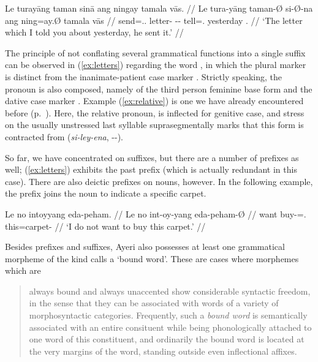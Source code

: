 \a\label{ex:relative}\begingl
	\gla Le turayāng taman sinā ang ningay tamala vās. //
	\glb Le tura-yāng taman-Ø si-Ø-na ang ning=ay.Ø tamala vās //
	\glc \PatTI{} send=\Tsg{}.\M{}.\Aarg{} letter-\Top{} 
		\Rel{}-\PatTI{}-\Gen{} \AgtT{} tell=\Fsg{}.\Top{} yesterday 
		\Ssg{}.\Parg{} //
	\glft `The letter which I told you about yesterday, he sent it.' //
\endgl
\xe

The principle of not conflating several grammatical functions into a single 
suffix can be observed in (\ref{ex:letters}) regarding the word 
, in which the plural marker 
 is distinct from the inanimate-patient case marker 
. Strictly speaking, the pronoun  
is also composed, namely of the third person feminine base form  
and the dative case marker . Example (\ref{ex:relative}) is one 
we have already encountered before (p.~\pageref{doublerel}). Here, the relative 
pronoun,  is inflected for genitive case, and 
stress on the usually unstressed last syllable 
suprasegmentally marks that this form is contracted from 
 (\textit{si-ley-ena}, \Rel{}-\PargI{}-\Gen{}).

So far, we have concentrated on suffixes, but there are a number of 
prefixes as well; (\ref{ex:letters}) exhibits the past prefix 
 (which is actually redundant in this case). There are also 
deictic prefixes on nouns, however. In the following example, the prefix 
 joins the noun  to indicate a 
specific carpet.

\ex\begingl
	\gla Le no intoyyang eda-peham. //
	\glb Le no int-oy-yang eda-peham-Ø //
	\glc \PatTI{} want buy-\Neg{}=\Fsg{}.\Aarg{} this=carpet-\Top{} //
	\glft `I do not want to buy this carpet.' //
\endgl\xe

Besides prefixes and suffixes, Ayeri also possesses at least one grammatical 
morpheme of the kind \citet{zwicky1977} calls a `bound word'. These are cases where morphemes which are

\blockcquote[6]{zwicky1977}{always bound and always unaccented show considerable 
syntactic freedom, in the sense that they can be associated with words of a 
variety of morphosyntactic categories. Frequently, such a \emph{bound word} is 
semantically associated with an entire consituent while being phonologically 
attached to one word of this constituent, and ordinarily the bound word is 
located at the very margins of the word, standing outside even inflectional 
affixes.}

